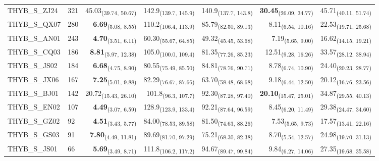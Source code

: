 \begin{table}[p]
\begin{tabular}{llrrrrr}
THYB\_S\_ZJ24 & 321 & 45.03\textsubscript{(39.74, 50.67)} & 142.9\textsubscript{(139.7, 145.9)} & 140.9\textsubscript{(137.7, 143.8)} & \textbf{30.45}\textsubscript{(26.09, 34.77)} & 45.71\textsubscript{(40.11, 51.74)} \\
THYB\_S\_QX07 & 280 & \textbf{6.69}\textsubscript{(5.08, 8.55)} & 110.2\textsubscript{(106.4, 113.9)} & 85.79\textsubscript{(82.50, 89.13)} & 8.11\textsubscript{(6.54, 10.16)} & 22.53\textsubscript{(19.71, 25.68)} \\
THYB\_S\_AN01 & 243 & \textbf{4.70}\textsubscript{(3.51, 6.11)} & 60.30\textsubscript{(55.67, 64.85)} & 49.32\textsubscript{(45.45, 53.68)} & 7.19\textsubscript{(5.65, 9.00)} & 16.62\textsubscript{(14.15, 19.21)} \\
THYB\_S\_CQ03 & 186 & \textbf{8.81}\textsubscript{(5.97, 12.38)} & 105.0\textsubscript{(100.0, 109.4)} & 81.35\textsubscript{(77.26, 85.23)} & 12.51\textsubscript{(9.28, 16.26)} & 33.57\textsubscript{(28.12, 38.94)} \\
THYB\_S\_JS02 & 184 & \textbf{6.68}\textsubscript{(4.75, 8.90)} & 80.55\textsubscript{(75.49, 85.50)} & 84.81\textsubscript{(78.76, 90.71)} & 8.78\textsubscript{(6.74, 10.90)} & 24.40\textsubscript{(20.23, 28.77)} \\
THYB\_S\_JX06 & 167 & \textbf{7.25}\textsubscript{(5.01, 9.88)} & 82.29\textsubscript{(76.67, 87.66)} & 63.70\textsubscript{(58.48, 68.68)} & 9.18\textsubscript{(6.44, 12.50)} & 20.12\textsubscript{(16.76, 23.56)} \\
THYB\_S\_BJ01 & 142 & 20.72\textsubscript{(15.43, 26.10)} & 101.8\textsubscript{(96.3, 107.7)} & 92.30\textsubscript{(87.28, 97.40)} & \textbf{20.10}\textsubscript{(15.47, 25.01)} & 34.87\textsubscript{(29.55, 40.13)} \\
THYB\_S\_EN02 & 107 & \textbf{4.49}\textsubscript{(3.07, 6.59)} & 128.9\textsubscript{(123.9, 133.4)} & 92.21\textsubscript{(87.64, 96.59)} & 8.45\textsubscript{(6.20, 11.49)} & 29.38\textsubscript{(24.47, 34.60)} \\
THYB\_S\_GZ02 & 92 & \textbf{4.51}\textsubscript{(3.43, 5.77)} & 84.00\textsubscript{(78.53, 89.58)} & 81.50\textsubscript{(74.63, 88.26)} & 7.53\textsubscript{(5.65, 9.73)} & 17.57\textsubscript{(13.41, 22.16)} \\
THYB\_S\_GS03 & 91 & \textbf{7.80}\textsubscript{(4.49, 11.81)} & 89.69\textsubscript{(81.70, 97.29)} & 75.21\textsubscript{(68.30, 82.38)} & 8.70\textsubscript{(5.54, 12.57)} & 24.98\textsubscript{(19.70, 31.13)} \\
THYB\_S\_JS01 & 66 & \textbf{5.69}\textsubscript{(3.49, 8.71)} & 111.8\textsubscript{(106.2, 117.2)} & 94.67\textsubscript{(89.47, 99.84)} & 9.84\textsubscript{(6.27, 14.06)} & 27.35\textsubscript{(19.68, 35.58)} \\

\end{tabular}
\end{table}
